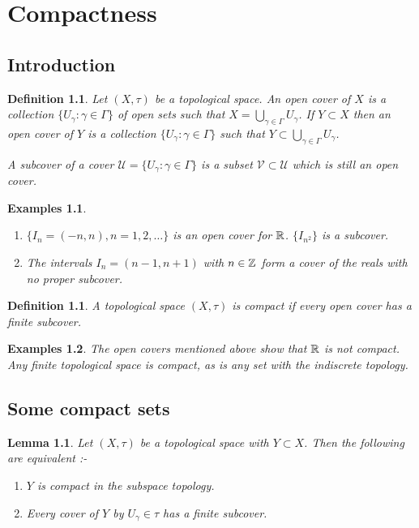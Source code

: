 \documentclass{notes}
\theoremstyle{plain}
\newtheorem{definition}[proposition]{Definition}
\newtheorem{lemma}[proposition]{Lemma}
\newtheorem*{examples}{Examples}
\newcommand{\cU}{\mathcal{U}}
\newcommand{\cV}{\mathcal{V}}
\begin{document}
\chapter{Compactness}

\section{Introduction}

\begin{definition}
Let $(X,\tau)$ be a topological space.  An open cover%
 of $X$ is a collection
$\{U_\gamma : \gamma \in \Gamma\}$ of open sets such that
$X = \bigcup_{\gamma \in \Gamma} U_\gamma$.  If $Y \subset X$ then 
an open cover of $Y$ is a collection $\{ U_\gamma : \gamma \in \Gamma\}$
such that $Y \subset \bigcup_{\gamma \in \Gamma} U_\gamma$.

A subcover of a cover $\cU = \{ U_\gamma : \gamma \in \Gamma \}$ is a subset
$\cV \subset \cU$ which is still an open cover.
\end{definition}

\begin{examples}
\begin{enumerate}
\item $\{I_n = (-n,n), n = 1, 2, \dots\}$ is an open cover for $\mathbb{R}$.
$\{ I_{n^2} \}$ is a subcover.
\item The intervals $I_n = (n-1,n+1)$ with $n \in \mathbb{Z}$ form a cover of the reals
with no proper subcover.
\end{enumerate}
\end{examples}

\begin{definition}
A topological space $(X,\tau)$ is compact %
if every open cover has a finite subcover.
\end{definition}

\begin{examples}
The open covers mentioned above show that $\mathbb{R}$ is not compact.  Any finite
topological space is compact, as is any set with the indiscrete topology.
\end{examples}

\section{Some compact sets}

\begin{lemma}
Let $(X,\tau)$ be a topological space with $Y \subset X$.  Then the following
are equivalent :-
\begin{enumerate}
\item $Y$ is compact in the subspace topology.
\item Every cover of $Y$ by $U_\gamma \in \tau$ has a finite subcover.
\end{enumerate}
\end{lemma}
\end{document}
